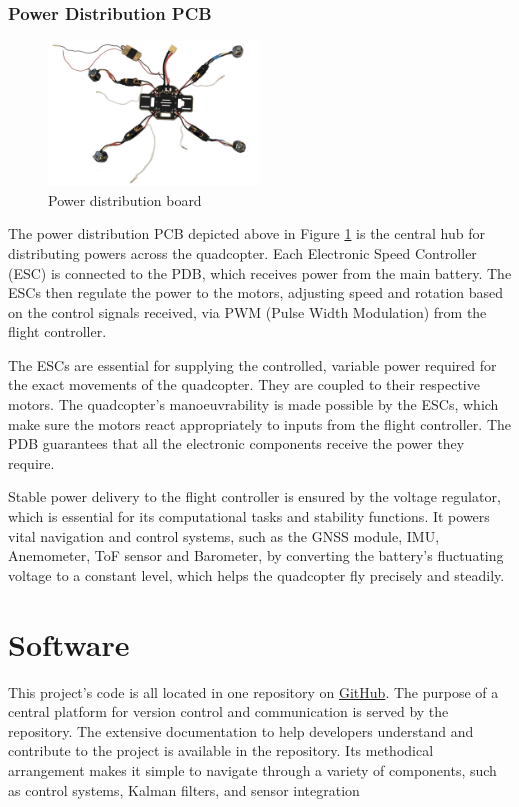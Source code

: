 \documentclass{report}
\begin{document}
\subsection{Power Distribution PCB}
\begin{figure}[H]
  \centering
  \includegraphics[width=0.5\textwidth]{Pictures/power_distribution_and_escs.png}
  \caption{Power distribution board}
  \label{fig:power_distribution}
\end{figure}
The power distribution PCB depicted above in Figure \ref{fig:power_distribution}
is the central hub for distributing powers across the quadcopter. Each
Electronic Speed Controller (ESC) is connected to the PDB, which receives power
from the main battery. The ESCs then regulate the power to the motors, adjusting
speed and rotation based on the control signals received, via PWM (Pulse Width
Modulation) from the flight controller.

The ESCs are essential for supplying the controlled, variable power required for
the exact movements of the quadcopter. They are coupled to their respective
motors. The quadcopter's manoeuvrability is made possible by the ESCs, which
make sure the motors react appropriately to inputs from the flight controller.
The PDB guarantees that all the electronic components receive the power they
require.

Stable power delivery to the flight controller is ensured by the voltage
regulator, which is essential for its computational tasks and stability
functions. It powers vital navigation and control systems, such as the GNSS
module, IMU, Anemometer, ToF sensor and Barometer, by converting the battery's
fluctuating voltage to a constant level, which helps the quadcopter fly
precisely and steadily.


\chapter{Software}                            
This project’s code is all located in one repository on
\href{https://github.com/QUB-ASL/bzzz}{GitHub}. The purpose of a central
platform for version control and communication is served by the repository. The
extensive documentation to help developers understand and contribute to the
project is available in the repository.  Its methodical arrangement makes it
simple to navigate through a variety of components, such as control systems,
Kalman filters, and sensor integration
\end{document}
